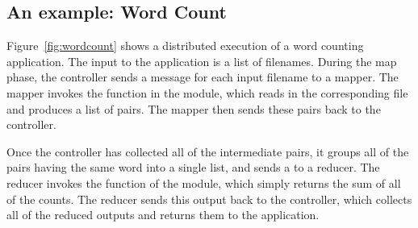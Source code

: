 \documentclass{pset}
\begin{document}
\subsection*{An example: Word Count}

Figure~\ref{fig:wordcount} shows a distributed execution of a word counting
application.  The input to the application is a list of filenames.  During the
map phase, the controller sends a  message for each input
filename to a mapper.  The mapper invokes the  function in the
 module, which reads in the corresponding file and produces
a list of  pairs.  The mapper then sends these pairs back to
the controller.

Once the controller has collected all of the intermediate 
pairs, it groups all of the pairs having the same word into a single list, and
sends a  to a reducer.  The reducer invokes the
 function of the  module, which simply returns
the sum of all of the counts.  The reducer sends this output back to the
controller, which collects all of the reduced outputs and returns them to the
 application.
\end{document}
